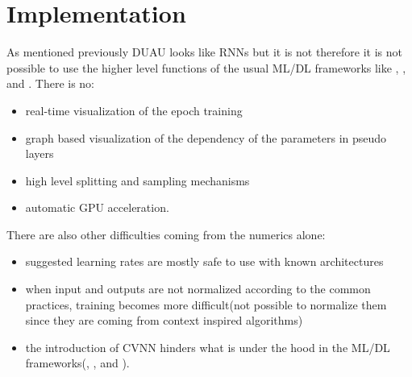 	
	
	
	
	
	
	
	




\section{Implementation}

As mentioned previously \ac{DU}\ac{AU} looks like \ac{RNN}s but it is not therefore it is not possible to use the higher level functions of the usual 
\ac{ML}/\ac{DL} frameworks like \tensorflow\cite{Abadi2016}, \keras\cite{Chollet2023}, and \pytorch\cite{Paszke2019}. There is no:
\begin{itemize}
	\item real-time visualization of the epoch training
	\item graph based visualization of the dependency of the parameters in pseudo layers
	\item high level splitting and sampling mechanisms
	\item automatic \ac{GPU} acceleration. 
\end{itemize}

There are also other difficulties coming from the numerics alone:
\begin{itemize}
	\item suggested learning rates are mostly safe to use with known architectures
	\item when input and outputs are not normalized according to the common practices, training becomes more difficult(not possible to normalize them since they are coming from context inspired algorithms)
	\item the introduction of \ac{CVNN}\cite{CTOBYZDSSSJFSSMNRYBCP2017}\cite{Bassey2021}\cite{Barrachina2023} hinders what is under the hood in the \ac{ML}/\ac{DL} frameworks(\tensorflow\cite{Abadi2016}, \keras\cite{Chollet2023}, and \pytorch\cite{Paszke2019}).
\end{itemize}

